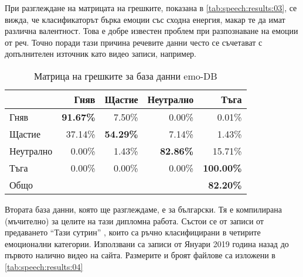 \documentclass[main.tex]{subfiles}
\begin{document}
При разглеждане на матрицата на грешките, показана в \autoref{tab:speech:results:03}, се вижда, че класификаторът
бърка емоции със сходна енергия, макар те да имат различна валентност. Това е добре известен проблем при разпознаване на емоции от реч. Точно поради тази причина речевите данни често се съчетават с допълнителен източник като видео записи, например. 

\begin{table}[h]
    \begin{center}
    \begin{tabular}{|l|r r r r|} 
        \hline
        & Гняв & Щастие & Неутрално & Тъга \\ 
        \hline
        Гняв &  \textbf{91.67\%} & 7.50\% & 0.00\% & 0.01\% \\ 
        Щастие & 37.14\% & \textbf{54.29\%} & 7.14\% & 1.43\% \\ 
        Неутрално & 0.00\% & 1.43\% & \textbf{82.86\%} & 15.71\% \\ 
        Тъга & 0.00\% & 0.00\% & 0.00\% & \textbf{100.00\%}\\ 
        \hline
        \hline
        Общо & & & & \textbf{82.20\%}\\
        \hline
    \end{tabular}
    \caption{Матрица на грешките за база данни emo-DB}
    \label{tab:speech:results:03}
    \end{center}
\end{table}

Втората база данни, която ще разглеждаме, е за български. Тя е компилирана (мъчително) за целите на тази дипломна работа. Състои се от записи от предаването ``Тази сутрин'' \cite{tazi-sutrin}, които са ръчно класифицирани в четирите емоционални категории. Използвани са записи от Януари 2019 година назад до първото налично видео на сайта. Размерите и броят файлове са изложени в \autoref{tab:speech:results:04}
\end{document}

